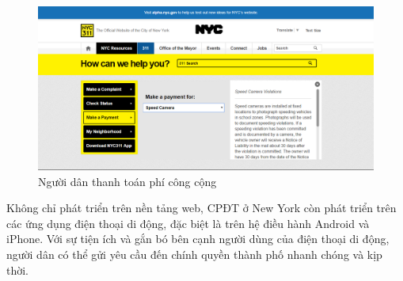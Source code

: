 \documentclass[a4paper]{article}
\begin{document}
\newpage
\begin{center}
    \begin{figure}[h]
    \begin{center}
     \includegraphics[scale=.4]{newyork_payment.PNG}
    \end{center}
    \caption{Người dân thanh toán phí công cộng}
    \label{refhinh2}
    \end{figure}
\end{center}
Không chỉ phát triển trên nền tảng web, CPĐT ở New York còn phát triển trên các ứng dụng điện thoại di động, đặc biệt là trên hệ điều hành Android và iPhone. Với sự tiện ích và gắn bó bên cạnh người dùng của điện thoại di động, người dân có thể gửi yêu cầu đến chính quyền thành phố nhanh chóng và kịp thời.\\
\end{document}
